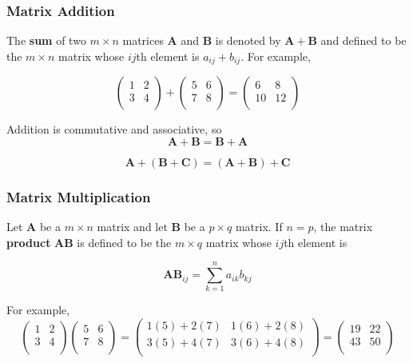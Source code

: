 \documentclass{beamer}
\begin{document}
\begin{frame}
\frametitle{Matrix Addition}
The \textbf{sum} of two $m \times n$ matrices $\mathbf{A}$ and $\mathbf{B}$ is denoted by $\mathbf{A} + \mathbf{B}$ and defined to be the $m \times n$ matrix whose $ij$th element is $a_{ij} + b_{ij}$.  For example,

\[
\begin{pmatrix}
    1 & 2\\
    3 & 4 \\
\end{pmatrix}
+
\begin{pmatrix}
    5 & 6\\
    7 & 8 \\
\end{pmatrix}
= 
\begin{pmatrix}
    6 & 8\\
    10 & 12 \\
\end{pmatrix}
\]

Addition is commutative and associative, so 
\[\mathbf{A} + \mathbf{B} = \mathbf{B} + \mathbf{A}\]

\[\mathbf{A} + (\mathbf{B} + \mathbf{C})= (\mathbf{A} + \mathbf{B}) + \mathbf{C}\]
\end{frame}

\begin{frame}
\frametitle{Matrix Multiplication}
Let $\mathbf{A}$ be a $m \times n$ matrix and let $\mathbf{B}$ be a $p \times q$ matrix.  If $n = p$, the matrix \textbf{product} $\mathbf{AB}$ is defined to be the $m \times q$ matrix whose $ij$th element is

\[\mathbf{AB}_{ij} = \sum_{k=1}^n a_{ik}b_{kj}\]

For example, 
\[
\begin{pmatrix}
    1 & 2\\
    3 & 4 \\
\end{pmatrix}
\begin{pmatrix}
    5 & 6\\
    7 & 8 \\
\end{pmatrix}
= 
\begin{pmatrix}
    1(5) + 2(7) & 1(6) + 2(8)\\
    3(5) + 4(7) & 3(6) + 4(8) \\
\end{pmatrix}
=
\begin{pmatrix}
    19 & 22\\
    43 & 50 \\
\end{pmatrix}
\]
\end{frame}
\end{document}
